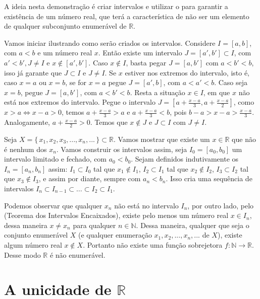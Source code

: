 \documentclass[../main.tex]{subfiles}
\begin{document}
\begin{dem}
    A ideia nesta demonstração é criar intervalos e utilizar o  para garantir a existência de um número real, que terá a característica de não ser um elemento de qualquer subconjunto enumerável de $\mathbb{R}$.

    Vamos iniciar ilustrando como serão criados os intervalos. Considere $I = [a,b]$, com $a < b$ e um número real $x$. Então existe um intervalo $J = [a',b'] \subset I$, com  $a' < b', J \neq I$ e $x \not\in [a',b']$.
    Caso $x \not\in I$, basta pegar $J = [a,b']$ com $a < b' < b$, isso já garante que $J \subset I$ e $J \neq I$. Se $x$ estiver nos extremos do intervalo, isto é, caso $x = a$ ou $x = b$, se for $x = a$ pegue $J = [a',b]$, com $a < a' < b$. Caso seja $x = b$, pegue $J = [a,b']$, com 
    $a < b' < b$. Resta a situação $x \in I$, em que $x$ não está nos extremos do intervalo. Pegue o intervalo $J = \left[ a + \frac{x-a}{3}, a + \frac{x-a}{2} \right]$, como $x > a \iff x-a > 0$, temos $a + \frac{x-a}{3} > a$ e 
    $a + \frac{x-a}{3} < b$, pois $b-a > x-a > \frac{x-a}{3}$. Analogamente, $a+ \frac{x-a}{2} > 0$. Temos que $x \not\in J$ e $J \subset I$ com $J \neq I$.

    Seja $X = \{\,x_1,x_2,x_3,...,x_n,...\,\} \subset \mathbb{R}$. Vamos mostrar que existe um $x \in \mathbb{R}$ que não é nenhum dos $x_n$.
    Vamos construir os intervalos assim, seja $I_0 = [a_0,b_0]$ um intervalo limitado e fechado, com $a_0 < b_0$. Sejam definidos indutivamente os $I_n = [a_n,b_n]$ assim: $I_1 \subset I_0$ tal que $x_1 \not\in I_1$, $I_2 \subset I_1$ tal que $x_2 \not\in I_2$,  $I_3 \subset I_2$ tal que $x_3 \not\in I_3$, e assim por diante, sempre com $a_n < b_n$. Isso cria uma sequência de intervalos $I_n \subset I_{n-1} \subset \dots \subset I_2 \subset I_1$.

    Podemos observar que qualquer $x_n$ não está no intervalo $I_n$, por outro lado, pelo  (Teorema dos Intervalos Encaixados), existe pelo menos um número real $x \in I_n$, dessa maneira $x \neq x_n$ para qualquer $n \in \mathbb{N}$. Dessa maneira, qualquer que seja o conjunto enumerável $X$ (e qualquer enumeração $x_1, x_2,...,x_n,...$ de $X$), existe algum número real $x \not\in X$. Portanto não existe uma função sobrejetora $f \colon \mathbb{N} \to \mathbb{R}$. Desse modo $\mathbb{R}$ é não enumerável.
\end{dem}

\section{A unicidade de $\mathbb{R}$}
\end{document}
